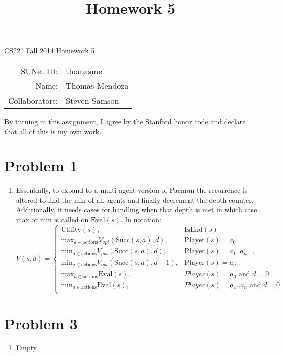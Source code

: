 \documentclass[12pt]{article}
\title{Homework 5}
\begin{document}
\begin{center}
{\Large CS221 Fall 2014 Homework 5}

\begin{tabular}{rl}
SUNet ID: & thomasme \\
Name: & Thomas Mendoza \\
Collaborators: & Steven Samson
\end{tabular}
\end{center}

By turning in this assignment, I agree by the Stanford honor code and declare
that all of this is my own work.

\section*{Problem 1}

\begin{enumerate}[label=(\alph*)]
	\item Essentially, to expand to a multi-agent version of Pacman the
		recurrence is altered to find the min of all agents and finally
		decrement the depth counter. Additionally, it needs cases for handling
		when that depth is met in which case max or min is called on
		\(\text{Eval}(s)\). In notation:
		\[
			V(s,d) = 
			\begin{cases}
				\text{Utility}(s), & \text{IsEnd}(s)\\
				\text{max}_{a \in \text{actions}} V_{opt}(\text{Succ}(s,a), d), &
					\text{Player}(s) = a_0\\
				\text{min}_{a \in \text{actions}} V_{opt}(\text{Succ}(s,a), d), &
					\text{Player}(s) = a_1..a_{n-1}\\
				\text{min}_{a \in \text{actions}} V_{opt}(\text{Succ}(s,a), d-1), &
					\text{Player}(s) = a_n\\
				\text{max}_{a \in \text{actions}} \text{Eval}(s), &
					Player(s) = a_0 \text{ and } d = 0\\
				\text{min}_{a \in \text{actions}} \text{Eval}(s), &
					Player(s) = a_1..a_n \text{ and } d = 0\\
			\end{cases}
		\]
\end{enumerate}

\section*{Problem 3}

\begin{enumerate}[label=(\alph*)]
	\item Empty
\end{enumerate}
\end{document}
